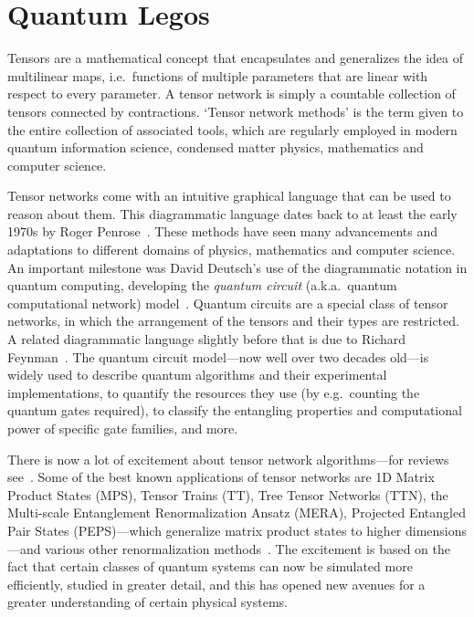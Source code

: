 \documentclass[aps,pra,12pt,nofootinbib,superscriptaddress,longbibliography]{revtex4-1}
\theoremstyle{plain}
\theoremstyle{definition}
\begin{document}
\section{Quantum Legos} 

Tensors are a mathematical concept that encapsulates and generalizes the idea of
multilinear maps, i.e.~functions of multiple parameters that are linear with respect to every parameter.
A tensor network is simply a countable collection of tensors connected by contractions.
`Tensor network methods' is the term given to the entire collection of associated tools, which are regularly employed in modern quantum information science, condensed matter physics, mathematics and computer science.  

Tensor networks come with an intuitive graphical language that can be used to reason about them.
This diagrammatic language
dates back to at least the early 1970s by Roger Penrose~\cite{Penrose}.
These methods have seen many advancements and adaptations to different domains of physics, mathematics and computer science.
An important milestone was David Deutsch's use of the diagrammatic notation in quantum computing,
developing the \emph{quantum circuit} (a.k.a.~quantum computational network)
model~\cite{Deutsch73}.
Quantum circuits are a special class of tensor networks, in which the arrangement of the tensors and their types are restricted.
A related diagrammatic language slightly before that is due to Richard Feynman~\cite{Feynman1986}.
The quantum circuit model---now well over two decades old---is widely used 
to describe quantum algorithms and their experimental implementations,
to quantify the resources they use (by e.g.~counting the quantum gates required),
to classify the entangling properties and computational power of specific gate families, and more.

There is now a lot of excitement about tensor network algorithms---for reviews
see~\cite{2014AnPhy.349..117O, Vidal2010, MPSreview08, TNSreview09, 2011AnPhy.326...96S, 2010arXiv1006.0675S, Schollw, 2014EPJB...87..280O,2013arXiv1308.3318E,2011JSP...145..891E, 2016arXiv160303039B, MAL-059, MAL-067}.
Some of the best known applications of tensor networks are 1D Matrix Product States (MPS),  Tensor Trains (TT), Tree Tensor Networks (TTN),
the Multi-scale Entanglement Renormalization Ansatz (MERA), Projected Entangled Pair States (PEPS)---which generalize matrix product states to higher dimensions---and various other renormalization methods~\cite{Vidal2010, MPSreview08, TNSreview09, 2011AnPhy.326...96S, 2009PhRvL.102e7202H, 2013arXiv1308.3318E, MAL-059}.
The excitement is based on the fact that certain
classes of quantum systems can now be simulated more efficiently, studied in greater detail,
and this has opened new avenues for a greater understanding of certain physical systems.
\end{document}
